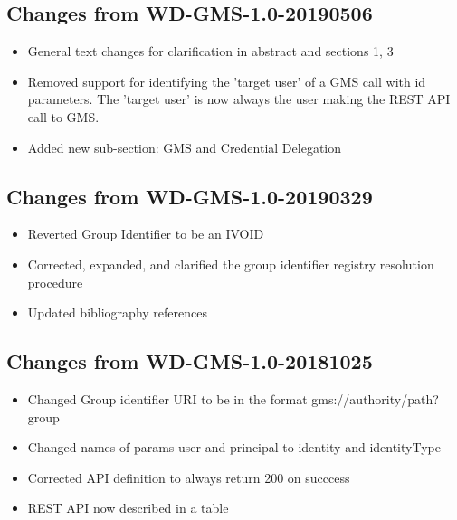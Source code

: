 \documentclass[11pt,a4paper]{ivoa}
\begin{document}
\subsection{Changes from WD-GMS-1.0-20190506}
\begin{itemize}
\item{General text changes for clarification in abstract and sections 1, 3}
\item{Removed support for identifying the 'target user' of a GMS call with id parameters.  The 'target user' is now always the user making the REST API call to GMS.}
\item{Added new sub-section: GMS and Credential Delegation}
\end{itemize}

\subsection{Changes from WD-GMS-1.0-20190329}
\begin{itemize}
\item{Reverted Group Identifier to be an IVOID}
\item{Corrected, expanded, and clarified the group identifier registry resolution procedure}
\item{Updated bibliography references}
\end{itemize}

\subsection{Changes from WD-GMS-1.0-20181025}
\begin{itemize}
\item{Changed Group identifier URI to be in the format gms://authority/path?group}
\item{Changed names of params user and principal to identity and identityType}
\item{Corrected API definition to always return 200 on succcess}
\item{REST API now described in a table}
\end{itemize}



\end{document}
